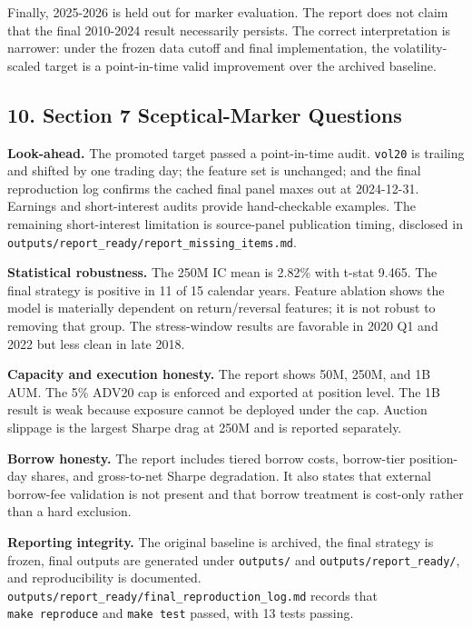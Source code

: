 \documentclass[
]{article}
\begin{document}
Finally, 2025-2026 is held out for marker evaluation. The report does
not claim that the final 2010-2024 result necessarily persists. The
correct interpretation is narrower: under the frozen data cutoff and
final implementation, the volatility-scaled target is a point-in-time
valid improvement over the archived baseline.

\hypertarget{10-section-7-sceptical-marker-questions}{%
\subsection{10. Section 7 Sceptical-Marker
Questions}\label{10-section-7-sceptical-marker-questions}}

\textbf{Look-ahead.} The promoted target passed a point-in-time audit.
\texttt{vol20} is trailing and shifted by one trading day; the feature
set is unchanged; and the final reproduction log confirms the cached
final panel maxes out at 2024-12-31. Earnings and short-interest audits
provide hand-checkable examples. The remaining short-interest limitation
is source-panel publication timing, disclosed in
\texttt{outputs/report\_ready/report\_missing\_items.md}.

\textbf{Statistical robustness.} The 250M IC mean is 2.82\% with t-stat
9.465. The final strategy is positive in 11 of 15 calendar years.
Feature ablation shows the model is materially dependent on
return/reversal features; it is not robust to removing that group. The
stress-window results are favorable in 2020 Q1 and 2022 but less clean
in late 2018.

\textbf{Capacity and execution honesty.} The report shows 50M, 250M, and
1B AUM. The 5\% ADV20 cap is enforced and exported at position level.
The 1B result is weak because exposure cannot be deployed under the cap.
Auction slippage is the largest Sharpe drag at 250M and is reported
separately.

\textbf{Borrow honesty.} The report includes tiered borrow costs,
borrow-tier position-day shares, and gross-to-net Sharpe degradation. It
also states that external borrow-fee validation is not present and that
borrow treatment is cost-only rather than a hard exclusion.

\textbf{Reporting integrity.} The original baseline is archived, the
final strategy is frozen, final outputs are generated under
\texttt{outputs/} and \texttt{outputs/report\_ready/}, and
reproducibility is documented.
\texttt{outputs/report\_ready/final\_reproduction\_log.md} records that
\texttt{make\ reproduce} and \texttt{make\ test} passed, with 13 tests
passing.
\end{document}
